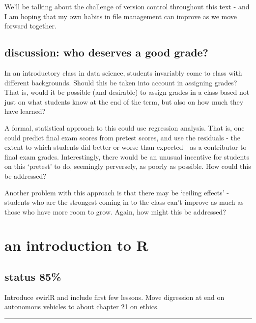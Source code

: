 \documentclass[
  openany]{book}
\begin{document}
We'll be talking about the challenge of version control throughout this text - and I am hoping that my own habits in file management can improve as we move forward together.

\hypertarget{discussion-who-deserves-a-good-grade}{%
\section{discussion: who deserves a good grade?}\label{discussion-who-deserves-a-good-grade}}

In an introductory class in data science, students invariably come to class with different backgrounds. Should this be taken into account in assigning grades? That is, would it be possible (and desirable) to assign grades in a class based not just on what students know at the end of the term, but also on how much they have learned?

A formal, statistical approach to this could use regression analysis. That is, one could predict final exam scores from pretest scores, and use the residuals - the extent to which students did better or worse than expected - as a contributor to final exam grades. Interestingly, there would be an unusual incentive for students on this `pretest' to do, seemingly perversely, as poorly as possible. How could this be addressed?

Another problem with this approach is that there may be `ceiling effects' - students who are the strongest coming in to the class can't improve as much as those who have more room to grow. Again, how might this be addressed?

\hypertarget{an-introduction-to-r}{%
\chapter{an introduction to R}\label{an-introduction-to-r}}

\hypertarget{status-85}{%
\section*{status 85\%}\label{status-85}}

Introduce swirlR and include first few lessons. Move digression at end on autonomous vehicles to about chapter 21 on ethics.

\begin{center}\rule{0.5\linewidth}{\linethickness}\end{center}
\end{document}
